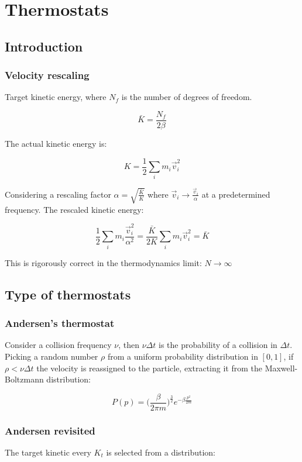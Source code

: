 \chapter{Thermostats}

\section{Introduction}

	\subsection{Velocity rescaling}

	Target kinetic energy, where $N_f$ is the number of degrees of freedom.

	$$\bar{K} = \frac{N_f}{2\beta}$$

	The actual kinetic energy is:

	$$K = \frac{1}{2}\sum\limits_i m_i\vec{v}_i^2$$

	Considering a rescaling factor $\alpha = \sqrt{\frac{\bar{K}}{K}}$ where $\vec{v}_i \rightarrow \frac{\vec{v}_i}{\alpha}$ at a predetermined frequency.
	The rescaled kinetic energy:

	$$\frac{1}{2}\sum\limits_{i}m_i\frac{\vec{v}_i^2}{\alpha^2} = \frac{\bar{K}}{2K}\sum\limits_{i}m_i\vec{v}_i^2 = \bar{K}$$

	This is rigorously correct in the thermodynamics limit: $N\rightarrow\infty$

\section{Type of thermostats}

	\subsection{Andersen's thermostat}
	Consider a collision frequency $\nu$, then $\nu\Delta t$ is the probability of a collision in $\Delta t$.
	Picking a random number $\rho$ from a uniform probability distribution in $[0,1]$, if $\rho<\nu\Delta t$ the velocity is reassigned to the particle, extracting it from the Maxwell-Boltzmann distribution:

	$$P(p) = \biggl(\frac{\beta}{2\pi m}\biggr)^{\frac{3}{2}}e^{-\beta\frac{p^2}{2m}}$$

	\subsection{Andersen revisited}
	The target kinetic every $K_t$ is selected from a distribution:

